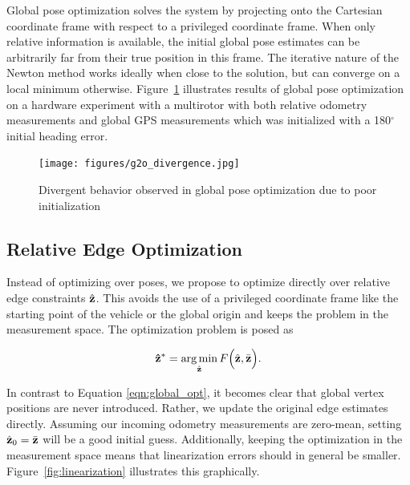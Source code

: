Global pose optimization solves the system by projecting onto the Cartesian coordinate frame with respect to a privileged coordinate frame. When only relative information is available, the initial global pose estimates can be arbitrarily far from their true position in this frame. The iterative nature of the Newton method works ideally when close to the solution, but can converge on a local minimum otherwise.  Figure~\ref{fig:g2o_divergence} illustrates results of global pose optimization on a hardware experiment with a multirotor with both relative odometry measurements and global GPS measurements which was initialized with a 180$^\circ$ initial heading error.

\begin{figure}
  \texttt{[image: figures/g2o\_divergence.jpg]}
  \caption{Divergent behavior observed in global pose optimization due to poor initialization}
  \label{fig:g2o_divergence}
\end{figure}


\subsection{Relative Edge Optimization}
Instead of optimizing over poses, we propose to optimize directly over relative edge constraints $\hat{\mathbf{z}}$.  This avoids the use of a privileged coordinate frame like the starting point of the vehicle or the global origin and keeps the problem in the measurement space.  The optimization problem is posed as

\begin{align}
  \mathbf{\hat{\mathbf{z}}}^* = \operatorname*{arg\,min}_{\hat{\mathbf{z}}} F\Big(\hat{\mathbf{z}},\bar{\mathbf{z}} \Big).
  \label{eqn:relative_opt}
\end{align}

In contrast to Equation \ref*{eqn:global_opt}, it becomes clear that global vertex positions are never introduced. Rather, we update the original edge estimates directly. Assuming our incoming odometry measurements are zero-mean, setting $\hat{\mathbf{z}}_0 = \bar{\mathbf{z}}$ will be a good initial guess.  Additionally, keeping the optimization in the measurement space means that linearization errors should in general be smaller.  Figure~\ref{fig:linearization} illustrates this graphically.

